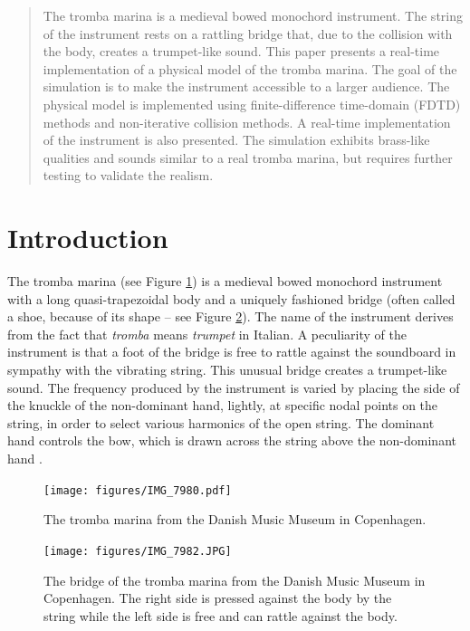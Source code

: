\begin{abstract}
    The tromba marina is a medieval bowed monochord instrument. The string of the instrument rests on a rattling bridge that, due to the collision with the body, creates a trumpet-like sound. This paper presents a real-time implementation of a physical model of the tromba marina. The goal of the simulation is to make the instrument accessible to a larger audience. The physical model is implemented using finite-difference time-domain (FDTD) methods and non-iterative collision methods. A real-time implementation of the instrument is also presented. The simulation exhibits brass-like qualities and sounds similar to a real tromba marina, but requires further testing to validate the realism.
    \end{abstract}
    
    \section{Introduction}\label{sec:introduction}
    The tromba marina (see Figure 
     \ref{fig:tromba}) is a medieval bowed monochord instrument with a long quasi-trapezoidal body and a uniquely fashioned bridge (often called a shoe, because of its shape – see Figure \ref{fig:bridge}). 
     The name of the instrument derives from the fact that {\em tromba} means {\em trumpet} in Italian. A peculiarity of the instrument is that 
     a foot of the bridge is free to rattle against the soundboard in sympathy with the vibrating string. 
     This unusual bridge creates a trumpet-like sound.
     The frequency produced by the instrument is varied by placing the side of the knuckle of the non-dominant hand, lightly, at specific nodal points on the string, in order to select various harmonics of the open string. The dominant hand controls the bow, which is drawn across the string above the non-dominant hand \cite{munrow1976instruments}.
     
      
    \begin{figure}
      \centering
      \texttt{[image: figures/IMG\_7980.pdf]}
      \caption{The tromba marina from the Danish Music Museum in Copenhagen. }
      \label{fig:tromba}
    \end{figure}
    
      \begin{figure}
      \centering
      \texttt{[image: figures/IMG\_7982.JPG]}
      \caption{The bridge of the tromba marina from the Danish Music Museum in Copenhagen. The right side is pressed against the body by the string while the left side is free and can rattle against the body.}
      \label{fig:bridge}
    \end{figure}
    
